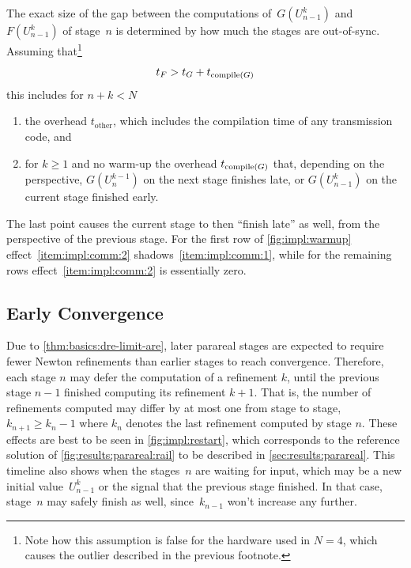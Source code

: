 The exact size of the gap between the computations of~$G(U_{n-1}^k)$ and~$F(U_{n-1}^k)$ of stage~$n$ is determined by
how much the stages are out-of-sync.
Assuming that\footnote{%
  Note how this assumption is false for the hardware used in $N=4$,
  which causes the outlier described in the previous footnote.
}
\begin{equation}
  t_F > t_G + t_{\operatorname{compile}(G)}
\end{equation}
this includes for $n+k < N$
\begin{enumerate}
  \item\label{item:impl:comm:1}
    the overhead $t_\text{other}$,
    which includes \eg the compilation time of any transmission code,
    and
  \item\label{item:impl:comm:2}
    for $k\geq 1$ and no warm-up
    the overhead $t_{\operatorname{compile}(G)}$ that,
    depending on the perspective,
    $G(U_n^{k-1})$ on the next stage finishes late,
    or $G(U_{n-1}^k)$ on the current stage finished early.
\end{enumerate}
The last point causes the current stage to then \enquote{finish late} as well,
from the perspective of the previous stage.
For the first row of \autoref{fig:impl:warmup} effect~\ref{item:impl:comm:2} shadows~\ref{item:impl:comm:1},
while for the remaining rows effect~\ref{item:impl:comm:2} is essentially zero.

\subsection{Early Convergence}
\label{sec:impl:pr:conv}

Due to \autoref{thm:basics:dre-limit-are},
later parareal stages are expected to require fewer Newton refinements than earlier stages to reach convergence.
Therefore, each stage $n$ may defer the computation of a refinement $k$,
until the previous stage $n-1$ finished computing its refinement $k+1$.
That is, the number of refinements computed may differ by at most one from stage to stage,
\ie $k_{n+1} \geq k_n -1$ where $k_n$ denotes the last refinement computed by stage $n$.
These effects are best to be seen in \autoref{fig:impl:restart},
which corresponds to the reference solution of \autoref{fig:results:parareal:rail} to be described in \autoref{sec:results:parareal}.
This timeline also shows when the stages~$n$ are waiting for input,
which may be a new initial value~$U_{n-1}^k$ or the signal that the previous stage finished.
In that case, stage~$n$ may safely finish as well,
since~$k_{n-1}$ won't increase any further.

